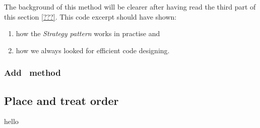 The background of this method will be clearer after having read the third part of this section \ref{???}. This code excerpt should have shown:

\begin{enumerate}
	\item how the \emph{Strategy pattern} works in practise and
	\item how we always looked for efficient code designing.
\end{enumerate}


\subsubsection{Add \FullMeal~method} %
\label{ssub:add_full_meal_method}











\subsection{Place and treat order} %
\label{sub:place_and_treat_order}

hello




